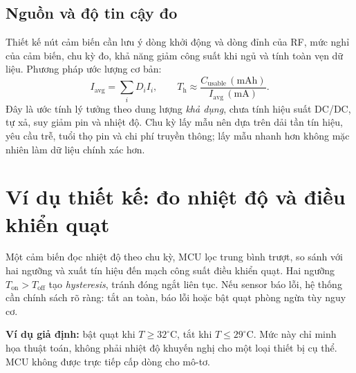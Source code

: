 \subsection{Nguồn và độ tin cậy đo}
Thiết kế nút cảm biến cần lưu ý dòng khởi động và dòng đỉnh của RF, mức nghỉ của cảm biến, chu kỳ đo, khả năng giảm công suất khi ngủ và tính toàn vẹn dữ liệu. Phương pháp ước lượng cơ bản:
\begin{equation}I_{\mathrm{avg}}=\sum_i D_i I_i,\qquad T_{\mathrm{h}}\approx\frac{C_{\mathrm{usable}}\,(\mathrm{mAh})}{I_{\mathrm{avg}}\,(\mathrm{mA})}.\end{equation}
Đây là ước tính lý tưởng theo dung lượng \emph{khả dụng}, chưa tính hiệu suất DC/DC, tự xả, suy giảm pin và nhiệt độ. Chu kỳ lấy mẫu nên dựa trên dải tần tín hiệu, yêu cầu trễ, tuổi thọ pin và chi phí truyền thông; lấy mẫu nhanh hơn không mặc nhiên làm dữ liệu chính xác hơn.

\section{Ví dụ thiết kế: đo nhiệt độ và điều khiển quạt}
Một cảm biến đọc nhiệt độ theo chu kỳ, MCU lọc trung bình trượt, so sánh với hai ngưỡng và xuất tín hiệu đến mạch công suất điều khiển quạt. Hai ngưỡng $T_{\mathrm{on}}>T_{\mathrm{off}}$ tạo \emph{hysteresis}, tránh đóng ngắt liên tục. Nếu sensor báo lỗi, hệ thống cần chính sách rõ ràng: tắt an toàn, báo lỗi hoặc bật quạt phòng ngừa tùy nguy cơ.
\begin{tipbox}
\textbf{Ví dụ giả định:} bật quạt khi $T\ge 32^\circ$C, tắt khi $T\le 29^\circ$C. Mức này chỉ minh họa thuật toán, không phải nhiệt độ khuyến nghị cho một loại thiết bị cụ thể. MCU không được trực tiếp cấp dòng cho mô-tơ.
\end{tipbox}

